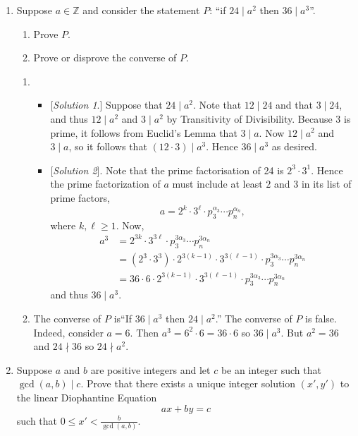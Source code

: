 \documentclass[11pt]{article}
\def\integers{\mathbb{Z}}
\begin{document}
\begin{enumerate}
\item Suppose $a\in\integers$ and consider the statement $P$: ``if $24\mid a^2$ then $36\mid a^3$''. 
\begin{enumerate}
 \item Prove $P$.
 \item Prove or disprove the converse of $P$.
\end{enumerate}
\begin{Solution}
\begin{enumerate}
\item 
\begin{itemize}
 \item{} [\emph{Solution 1}.] Suppose that $24\mid a^2$. Note that $12\mid 24$ and that $3\mid 24$, and thus $12\mid a^2$ and $3\mid a^2$ by Transitivity of Divisibility. Because $3$ is prime, it follows from Euclid's Lemma that $3\mid a$. Now $12\mid a^2$ and $3\mid a$, so it follows that $(12\cdot 3) \mid a^3$. Hence $36\mid a^3$ as desired.
  \item{} [\emph{Solution 2}]. Note that the prime factorisation of 24 is $2^3\cdot 3^1$. Hence the prime factorization of $a$ must include at least $2$ and $3$ in its list of prime factors,
  \[
   a = 2^k\cdot 3^\ell \cdot p_3^{\alpha_3}\cdots p_n^{\alpha_n},
  \]
where $k,\ell\geq 1$. Now,
\begin{align*}
 a^3 &= 2^{3k}\cdot 3^{3\ell} \cdot p_3^{3\alpha_3}\cdots p_n^{3\alpha_n}\\
  & = (2^3\cdot3^3)\cdot 2^{3(k-1)}\cdot 3^{3(\ell-1)} \cdot p_3^{3\alpha_3}\cdots p_n^{3\alpha_n}\\
  & = 36\cdot 6 \cdot 2^{3(k-1)}\cdot 3^{3(\ell-1)} \cdot p_3^{3\alpha_3}\cdots p_n^{3\alpha_n}
\end{align*}
and thus $36\mid a^3$.
\end{itemize}
\item The converse of $P$ is``If $36\mid a^3$ then $24\mid a^2$.''
The converse of $P$ is false. Indeed, consider $a=6$. Then $a^3 = 6^2\cdot 6 = 36\cdot 6$ so $36\mid a^3$. But $a^2 = 36$ and $24\nmid 36$ so $24\nmid a^2$.
\end{enumerate}
\end{Solution}

\item Suppose $a$ and $b$ are positive integers and let $c$ be an integer such that $\gcd(a,b)\mid c$. Prove that there exists a unique integer solution $(x',y')$ to the linear Diophantine Equation 
\[
 ax+by=c
\]
such that $0\leq x'<\frac{b}{\gcd(a,b)}$.


\end{enumerate}
\end{document}
